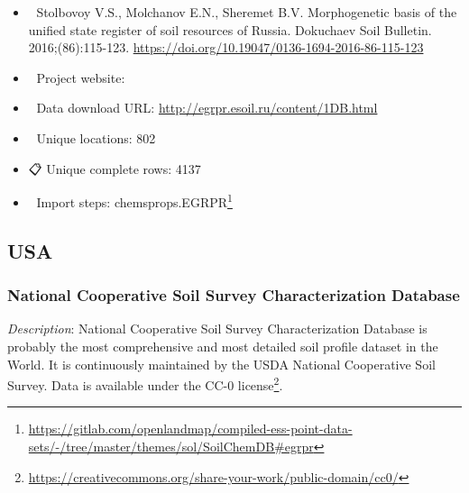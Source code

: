 \documentclass[
  graybox,natbib,nospthms]{svmono}
\providecommand{\tightlist}{%
  \setlength{\itemsep}{0pt}\setlength{\parskip}{0pt}}
\providecommand{\tightlist}{\setlength{\itemsep}{0pt}\setlength{\parskip}{0pt}}
\renewcommand{\href}[2]{#2 (\url{#1})}
\renewcommand{\href}[2]{#2\footnote{\url{#1}}}
\begin{document}
\begin{itemize}
\tightlist
\item
  📕 Stolbovoy V.S., Molchanov E.N., Sheremet B.V. Morphogenetic basis of the unified state register of soil resources of Russia. Dokuchaev Soil Bulletin. 2016;(86):115-123. \url{https://doi.org/10.19047/0136-1694-2016-86-115-123}\\
\item
  🔗 Project website:\\
\item
  📂 Data download URL: \url{http://egrpr.esoil.ru/content/1DB.html}\\
\item
  📍 Unique locations: 802\\
\item
  📋 Unique complete rows: 4137\\
\item
  📝 Import steps: \href{https://gitlab.com/openlandmap/compiled-ess-point-data-sets/-/tree/master/themes/sol/SoilChemDB\#egrpr}{chemsprops.EGRPR}
\end{itemize}

\hypertarget{usa}{%
\subsection{USA}\label{usa}}

\hypertarget{national-cooperative-soil-survey-characterization-database}{%
\subsubsection{National Cooperative Soil Survey Characterization Database}\label{national-cooperative-soil-survey-characterization-database}}

\emph{Description}: National Cooperative Soil Survey Characterization Database is probably
the most comprehensive and most detailed soil profile dataset in the World. It is continuously
maintained by the USDA National Cooperative Soil Survey. Data is available under the
\href{https://creativecommons.org/share-your-work/public-domain/cc0/}{CC-0 license}.
\end{document}
